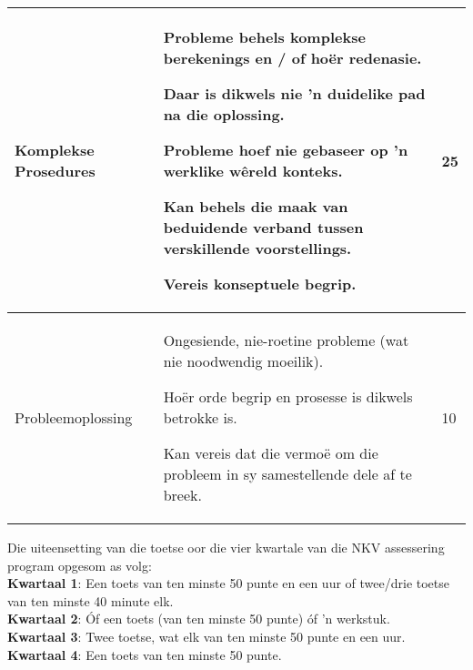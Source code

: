 \begin{table}[H]
\begin{center}
\begin{tabular} {|p{3cm}|p{7cm}|p{1.5cm}|}
Komplekse Prosedures &
Probleme behels komplekse berekenings en / of ho\"{e}r redenasie. \par 
Daar is dikwels nie 'n duidelike pad na die oplossing. \par 
Probleme hoef nie gebaseer op 'n werklike w\^{e}reld konteks. \par 
Kan behels die maak van beduidende verband tussen verskillende voorstellings. \par 
Vereis konseptuele begrip.
&
25 \\ \hline
Probleemoplossing & 
Ongesiende, nie-roetine probleme (wat nie noodwendig moeilik). \par 
Ho\"{e}r orde begrip en prosesse is dikwels betrokke is. \par 
Kan vereis dat die vermo\"{e} om die probleem in sy samestellende dele af te breek.
&
10 \\ \hline

\end{tabular}
 \end{center}
\end{table}

Die uiteensetting van die toetse oor die vier kwartale van die NKV assessering program opgesom as volg:\\
\textbf{Kwartaal 1}: Een toets van ten minste 50 punte en een uur of twee/drie toetse van ten minste 40 minute elk.\\
\textbf{Kwartaal 2}: \'{O}f een toets (van ten minste 50 punte) \'{o}f 'n werkstuk.\\
\textbf{Kwartaal 3}: Twee toetse, wat elk van ten minste 50 punte en een uur.\\
\textbf{Kwartaal 4}: Een toets van ten minste 50 punte.\\

